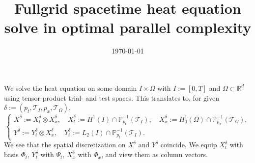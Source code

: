 \documentclass[11pt,a4paper]{amsart}
\theoremstyle{definition}
\newcommand{\R}{\mathbb{R}}
\renewcommand{\P}{\mathbb P}
\newcommand{\kron}{\otimes}
\newcommand{\T}{\mathcal{T}}
\begin{document}
\title{Fullgrid spacetime heat equation solve in optimal parallel complexity}
\date{\today}
\maketitle

We solve the heat equation on some domain $I \times \Omega$ with $I := [0, T]$
and $\Omega \subset \R^d$ using tensor-product trial- and test spaces. This
translates to, for given $\delta := (p_t, \T_I, p_x, \T_\Omega)$,
\[
  \begin{cases}
  X^\delta := X^\delta_t \kron X^\delta_x, \quad X^\delta_t := H^1(I) \cap \P_{p_t}^{-1}(\T_I), \quad X^\delta_x := H^1_0(\Omega) \cap \P_{p_x}^{-1}(\T_\Omega), \\
  Y^\delta := Y^\delta_t \kron X^\delta_x, \quad Y^\delta_t := L_2(I) \cap \P_{p_t}^{-1}(\T_I).
  \end{cases}
\]
We see that the spatial discretization on $X^\delta$ and $Y^\delta$ coincide.
We equip $X^\delta_t$ with basis $\Phi_t$, $Y^\delta_t$ with $\Psi_t$, $X^\delta_x$ with $\Phi_x$, and view them as column vectors.
\end{document}
